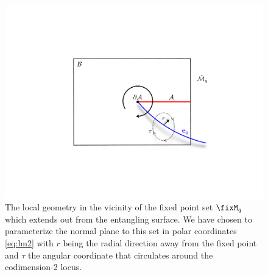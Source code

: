 \documentclass[12pt,openany]{book}
\begin{document}
\begin{figure}[htbp]
\begin{center}
\includegraphics[width=4.5in]{figures/normaleq}
\caption{The local geometry in the vicinity of the fixed point set $\fixM_q$ which extends out from the entangling surface. We have chosen to parameterize the normal plane to this set in polar coordinates \eqref{eq:lm2} with $r$ being the radial direction away from the fixed point and $\tau$ the angular coordinate that circulates around the codimension-2 locus.
}
\label{f:bdycondq}
\end{center}
\end{figure}
%
\end{document}
